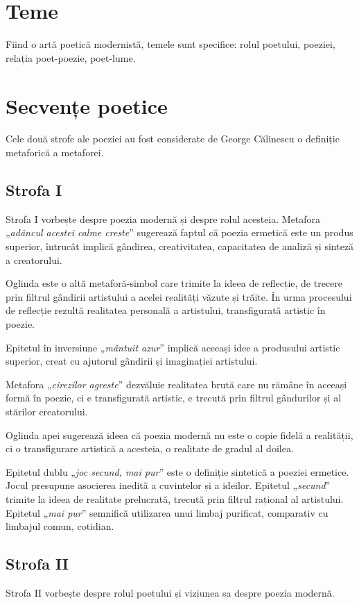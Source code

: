 \documentclass{article}
\newcommand{\qu}[1]{„\emph{#1}”}
\begin{document}
\section{Teme}
Fiind o artă poetică modernistă, temele sunt specifice: rolul poetului, poeziei, relația poet-poezie, poet-lume.

\section{Secvențe poetice}
Cele două strofe ale poeziei au fost considerate de George Călinescu o definiție metaforică a metaforei.

\subsection{Strofa I}
Strofa I vorbește despre poezia modernă și despre rolul acesteia. Metafora \qu{adâncul acestei calme creste} sugerează faptul că poezia ermetică este un produs superior, întrucât implică gândirea, creativitatea, capacitatea de analiză și sinteză a creatorului.

Oglinda este o altă metaforă-simbol care trimite la ideea de reflecție, de trecere prin filtrul gândirii artistului a acelei realități văzute și trăite. În urma procesului de reflecție rezultă realitatea personală a artistului, transfigurată artistic în poezie.

Epitetul în inversiune \qu{mântuit azur} implică aceeași idee a produsului artistic superior, creat cu ajutorul gândirii și imaginației artistului.

Metafora \qu{cirezilor agreste} dezvăluie realitatea brută care nu rămâne în aceeași formă în poezie, ci e transfigurată artistic, e trecută prin filtrul gândurilor și al stărilor creatorului.

Oglinda apei sugerează ideea că poezia modernă nu este o copie fidelă a realității, ci o transfigurare artistică a acesteia, o realitate de gradul al doilea.

Epitetul dublu \qu{joc secund, mai pur} este o definiție sintetică a poeziei ermetice. Jocul presupune asocierea inedită a cuvintelor și a ideilor. Epitetul \qu{secund} trimite la ideea de realitate prelucrată, trecută prin filtrul rațional al artistului. Epitetul \qu{mai pur} semnifică utilizarea unui limbaj purificat, comparativ cu limbajul comun, cotidian.

\subsection{Strofa II}
Strofa II vorbește despre rolul poetului și viziunea sa despre poezia modernă.
\end{document}
